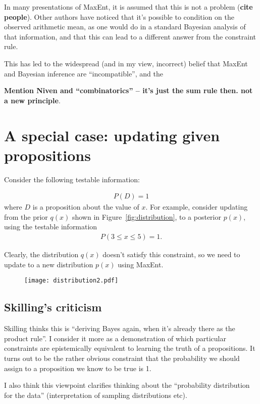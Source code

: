 \documentclass[a4paper, 11pt]{article}
\begin{document}
In many presentations of MaxEnt, it is assumed that this is not a problem
({\bf cite people}). Other authors have noticed that it's possible to
condition on the observed arithmetic mean, as one would do in a standard
Bayesian analysis of that information, and that this can lead to a different
answer from the constraint rule.

This has led to the widespread (and in my view, incorrect) belief that
MaxEnt and Bayesian inference are ``incompatible'', and the 


{\bf Mention Niven and ``combinatorics'' -- it's just the sum rule then. not
a new principle}.

\section{A special case: updating given propositions}
Consider the following testable information:

\begin{eqnarray}
P(D) = 1
\end{eqnarray}
where $D$ is a proposition about the value of $x$. For example, consider
updating from the prior $q(x)$ shown in Figure~\ref{fig:distribution}, to
a posterior $p(x)$, using the testable information
\begin{eqnarray}
P(3 \leq x \leq 5) = 1.
\end{eqnarray}

Clearly, the distribution $q(x)$ doesn't satisfy this constraint, so we
need to update to a new distribution $p(x)$ using MaxEnt.

\begin{figure}
\begin{center}
\texttt{[image: distribution2.pdf]}
\caption{\label{fig:distribution2}}
\end{center}
\end{figure}

\subsection{Skilling's criticism}
Skilling thinks this is ``deriving Bayes again, when it's already there
as the product rule''. I consider it more as a demonstration of which
particular constraints are epistemically equivalent to learning the
truth of a propositions. It turns out to be the rather obvious constraint
that the probability we should assign to a proposition we know to be true
is 1.

I also think this viewpoint clarifies thinking about the ``probability
distribution for the data'' (interpretation of sampling distributions etc).
\end{document}
